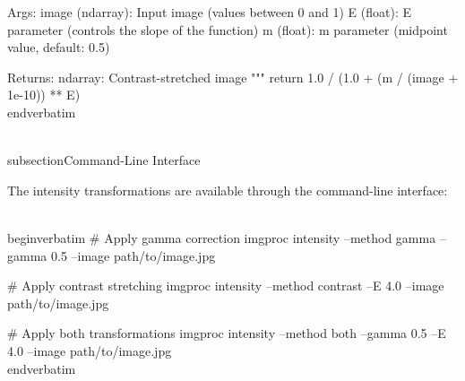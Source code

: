     Args:
        image (ndarray): Input image (values between 0 and 1)
        E (float): E parameter (controls the slope of the function)
        m (float): m parameter (midpoint value, default: 0.5)
        
    Returns:
        ndarray: Contrast-stretched image
    """
    return 1.0 / (1.0 + (m / (image + 1e-10)) ** E)
\\end{verbatim}

\\subsection{Command-Line Interface}

The intensity transformations are available through the command-line interface:

\\begin{verbatim}
# Apply gamma correction
imgproc intensity --method gamma --gamma 0.5 --image path/to/image.jpg

# Apply contrast stretching
imgproc intensity --method contrast --E 4.0 --image path/to/image.jpg

# Apply both transformations
imgproc intensity --method both --gamma 0.5 --E 4.0 --image path/to/image.jpg
\\end{verbatim}
